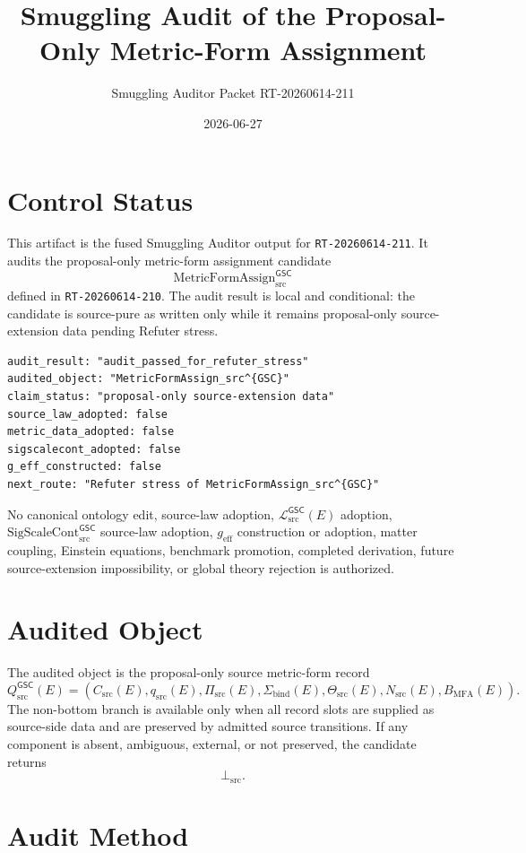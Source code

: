 \documentclass[11pt]{article}
\title{Smuggling Audit of the Proposal-Only Metric-Form Assignment}
\author{Smuggling Auditor Packet RT-20260614-211}
\date{2026-06-27}
\newcommand{\MetricData}{\mathcal{L}_{\mathrm{src}}^{\mathsf{GSC}}}
\newcommand{\geff}{g_{\mathrm{eff}}}
\newcommand{\SigScaleCont}{\mathrm{SigScaleCont}_{\mathrm{src}}^{\mathsf{GSC}}}
\newcommand{\MetricFormAssign}{\mathrm{MetricFormAssign}_{\mathrm{src}}^{\mathsf{GSC}}}
\newcommand{\Qsrc}{Q_{\mathrm{src}}^{\mathsf{GSC}}}
\newcommand{\CarrierSrc}{C_{\mathrm{src}}}
\newcommand{\FormTok}{q_{\mathrm{src}}}
\newcommand{\PairTok}{\Pi_{\mathrm{src}}}
\newcommand{\TransportTok}{\Theta_{\mathrm{src}}}
\newcommand{\NondegTok}{N_{\mathrm{src}}}
\newcommand{\BottomSrc}{\bot_{\mathrm{src}}}
\begin{document}
\maketitle

\section{Control Status}

This artifact is the fused Smuggling Auditor output for
\texttt{RT-20260614-211}. It audits the proposal-only metric-form assignment
candidate
\[
  \MetricFormAssign
\]
defined in \texttt{RT-20260614-210}. The audit result is local and
conditional: the candidate is source-pure as written only while it remains
proposal-only source-extension data pending Refuter stress.

\begin{verbatim}
audit_result: "audit_passed_for_refuter_stress"
audited_object: "MetricFormAssign_src^{GSC}"
claim_status: "proposal-only source-extension data"
source_law_adopted: false
metric_data_adopted: false
sigscalecont_adopted: false
g_eff_constructed: false
next_route: "Refuter stress of MetricFormAssign_src^{GSC}"
\end{verbatim}

No canonical ontology edit, source-law adoption, \(\MetricData(E)\) adoption,
\(\SigScaleCont\) source-law adoption, \(\geff\) construction or adoption,
matter coupling, Einstein equations, benchmark promotion, completed
derivation, future source-extension impossibility, or global theory rejection
is authorized.

\section{Audited Object}

The audited object is the proposal-only source metric-form record
\[
  \Qsrc(E)=
  (\CarrierSrc(E),\FormTok(E),\PairTok(E),\Sigma_{\mathrm{bind}}(E),
  \TransportTok(E),\NondegTok(E),B_{\mathrm{MFA}}(E)).
\]
The non-bottom branch is available only when all record slots are supplied as
source-side data and are preserved by admitted source transitions. If any
component is absent, ambiguous, external, or not preserved, the candidate
returns
\[
  \BottomSrc .
\]

\section{Audit Method}
\end{document}
